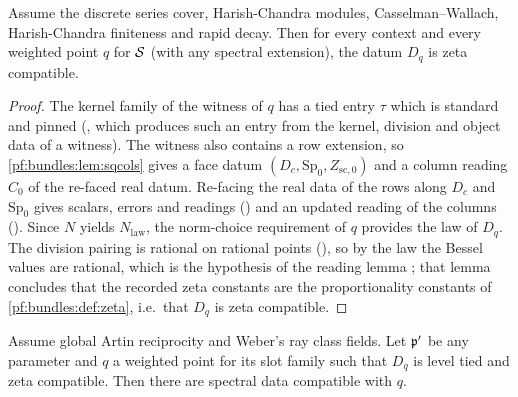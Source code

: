 \begin{lemma}\label{pf:bundles:lem:zeta}
Assume the discrete series cover, Harish-Chandra modules, Casselman--Wallach, Harish-Chandra finiteness and rapid decay. Then for
every context and every weighted point $q$ for $\mathcal S$ (with any spectral extension), the datum $D_q$ is zeta compatible.
\end{lemma}

\begin{proof}
The kernel family of the witness of $q$ has a tied entry $\tau$ which is standard and pinned
(, which produces such an entry from the kernel, division and object data of a
witness). The witness also contains a row extension, so \cref{pf:bundles:lem:sqcols} gives a face datum $(D_c,\mathrm{Sp}_0,Z_{\mathrm{sc},0})$
and a column reading $C_0$ of the re-faced real datum. Re-facing the real data of the rows along $D_c$ and $\mathrm{Sp}_0$
gives scalars, errors and readings () and an updated reading of the
columns (). Since $N$ yields $N_{\mathrm{law}}$, the norm-choice requirement of $q$
provides the law of $D_q$. The division pairing is rational on rational points
(), so by the law the Bessel values are rational, which is
the hypothesis of the reading lemma ; that lemma concludes that the recorded zeta constants
are the proportionality constants of \cref{pf:bundles:def:zeta}, i.e.\ that $D_q$ is zeta compatible.
\end{proof}

\begin{lemma}\label{pf:bundles:lem:specdata}
Assume global Artin reciprocity and Weber's ray class fields. Let $\mathfrak p'$ be any parameter and $q$ a weighted point for its slot family such
that $D_q$ is level tied and zeta compatible. Then there are spectral data compatible with $q$.
\end{lemma}

